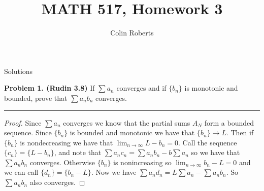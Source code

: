 \documentclass[leqno]{article}
\author{Colin Roberts}
\title{MATH 517, Homework 3}
\theoremstyle{nonumberplain}
\newtheorem{proof}{Proof}
\begin{document}
\maketitle
\begin{large}
\begin{center}
Solutions
\end{center}
\end{large}
\pagebreak


\noindent\textbf{Problem 1. (Rudin 3.8)} If $\sum a_n$ converges and if $\{b_n\}$ is monotonic and bounded, prove that $\sum a_n b_n$ converges.
 

\noindent\rule[0.5ex]{\linewidth}{1pt}

\begin{proof}
Since $\sum a_n$ converges we know that the partial sums $A_N$ form a bounded sequence.  Since $\{b_n\}$ is bounded and monotonic we have that $\{b_n\}\to L$.  Then if $\{b_n\}$ is nondecreasing we have that $\lim_{n\to \infty} L-b_n=0$.  Call the sequence $\{c_n\}=\{L-b_n\}$, and note that $\sum a_n c_n = \sum a_n b_n - b\sum a_n$ so we have that $\sum a_n b_n$ converges.  Otherwise $\{b_n\}$ is nonincreasing so $\lim_{n\to \infty} b_n-L=0$ and we can call $\{d_n\}=\{b_n-L\}$.  Now we have $\sum a_n d_n = L \sum a_n -\sum a_n b_n$. So $\sum a_n b_n$ also converges.  
\end{proof}

\pagebreak

\end{document}
